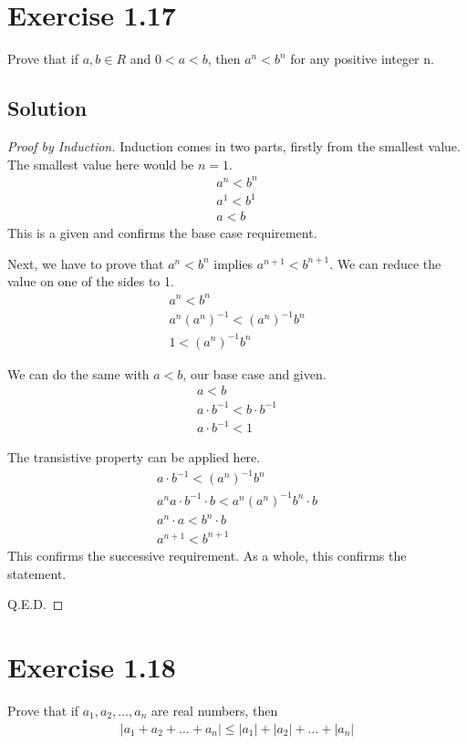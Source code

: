 \documentclass[12pt]{report}
\begin{document}
\pagebreak
\section{Exercise 1.17}
Prove that if $a, b \in R$ and $0 < a < b$, then  $a^n < b^n$ for any positive integer n. 

\subsection*{Solution}
\begin{proof}[Proof by Induction]
    Induction comes in two parts, firstly from the smallest value. 
    The smallest value here would be $n = 1$.
    \begin{gather}
        a^n < b^n\\
        a^1 < b^1\\
        a < b
    \end{gather}
    This is a given and confirms the base case requirement.

    Next, we have to prove that $a^n < b^n$ implies $a^{n + 1} < b^{n + 1}$.
    We can reduce the value on one of the sides to 1.
    \begin{gather}
        a^n < b^n\\
        a^n (a^n)^{-1} < (a^n)^{-1} b^n\\
        1 < (a^n)^{-1} b^n
    \end{gather}

    We can do the same with $a < b$, our base case and given.
    \begin{gather}
        a < b\\
        a \cdot b^{-1} < b \cdot b^{-1}\\
        a \cdot b^{-1} < 1
    \end{gather}

    The transistive property can be applied here.
    \begin{gather}
        a \cdot b^{-1} < (a^n)^{-1} b^n\\
        a^n a \cdot b^{-1} \cdot b < a^n (a^n)^{-1} b^n \cdot b\\
        a^n \cdot a < b^n \cdot b\\
        a^{n + 1} < b^{n + 1}
    \end{gather}
    This confirms the successive requirement.
    As a whole, this confirms the statement.

    Q.E.D.
\end{proof}

\pagebreak
\section{Exercise 1.18}
Prove that if $a_1, a_2,\dots,a_n$ are real numbers, then 
\begin{gather*}
    \left| a_1 + a_2 + \dots + a_n \right| \le \left|a_1\right| + \left|a_2\right| + \dots + \left|a_n\right|
\end{gather*}
\end{document}
